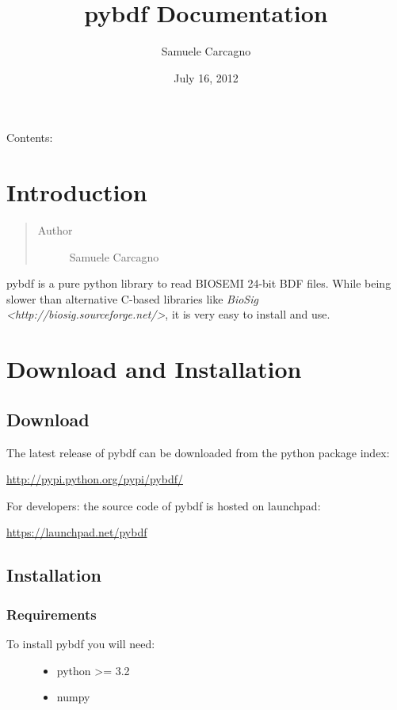 \documentclass[letterpaper,10pt,english]{sphinxmanual}
\title{pybdf Documentation}
\date{July 16, 2012}
\author{Samuele Carcagno}
\begin{document}
\maketitle
\tableofcontents
{}\label{index::doc}


Contents:


\chapter{Introduction}
\label{intro:introduction}\label{intro:welcome-to-pybdf-s-documentation}\label{intro::doc}\begin{quote}\begin{description}
\item[{Author}] \leavevmode
Samuele Carcagno

\end{description}\end{quote}

pybdf is a pure python library to read BIOSEMI 24-bit BDF files.
While being slower than alternative C-based libraries like
\emph{BioSig \textless{}http://biosig.sourceforge.net/\textgreater{}}, it is very easy to install
and use.


\chapter{Download and Installation}
\label{intro:download-and-installation}

\section{Download}
\label{intro:download}
The latest release of pybdf can be downloaded from the python package index:

\href{http://pypi.python.org/pypi/pybdf/}{http://pypi.python.org/pypi/pybdf/}

For developers: the source code of pybdf is hosted on
launchpad:

\href{https://launchpad.net/pybdf}{https://launchpad.net/pybdf}


\section{Installation}
\label{intro:installation}

\subsection{Requirements}
\label{intro:requirements}\begin{description}
\item[{To install pybdf you will need:}] \leavevmode\begin{itemize}
\item {} 
python \textgreater{}= 3.2

\item {} 
numpy

\end{itemize}

\end{description}
\end{document}
